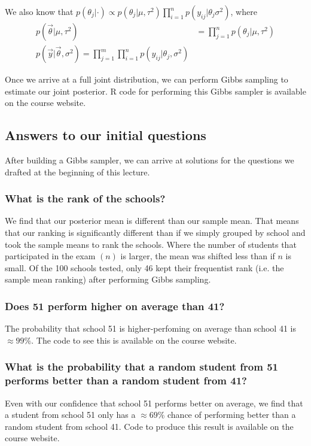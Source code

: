 \documentclass[titlepage, 12pt, leqno]{article}
\begin{document}
We also know that 
$p(\theta_{j}|\cdot) \propto p(\theta_{j}|\mu, \tau^{2}) \prod_{i=1}^{n}
p(y_{ij}|\theta_{j}\sigma^{2})$, where
\begin{align*}
    p(\vec \theta|\mu, \tau^{2}) &= \prod_{j=1}^{n}p(\theta_{j}|\mu,\tau^{2})\\
    p(\vec y|\vec \theta,\sigma^{2}) = \prod_{j=1}^{m} \prod_{i=1}^{n}
    p(y_{ij}|\theta_{j},\sigma^{2})
\end{align*}

Once we arrive at a full joint distribution, we can perform Gibbs sampling to
estimate our joint posterior. R code for performing this Gibbs sampler is 
available on the course website.

\subsection{Answers to our initial questions}

After building a Gibbs sampler, we can arrive at solutions for the questions we
drafted at the beginning of this lecture.

\subsubsection{What is the rank of the schools?}
We find that our posterior mean is different than our sample mean. That means
that our ranking is significantly different than if we simply grouped by school
and took the sample means to rank the schools. Where the number of students that
participated in the exam $(n)$ is larger, the mean was shifted less than if
$n$ is small. Of the 100 schools tested, only 46 kept their frequentist rank 
(i.e. the sample mean ranking) after performing Gibbs sampling.

\subsubsection{Does 51 perform higher on average than 41?}
The probability that school 51 is higher-perfoming on average than school 41
is $\approx 99\%$. The code to see this is available on the course website.

\subsubsection{What is the probability that a random student from 51 performs
better than a random student from 41?}
Even with our confidence that school 51 performs better on average, we find that
a student from school 51 only has a $\approx 69\%$ chance of performing better
than a random student from school 41. Code to produce this result is available
on the course website.
\end{document}
